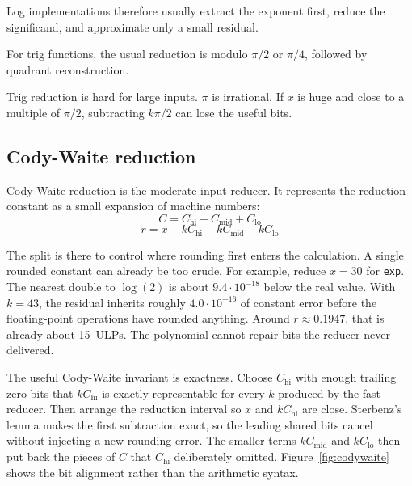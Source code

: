\documentclass[manuscript, nonacm]{acmart}
\begin{document}
  Log implementations therefore usually extract the exponent first, reduce the
  significand, and approximate only a small residual.

  For trig functions, the usual reduction is modulo $\pi/2$ or $\pi/4$,
  followed by quadrant reconstruction.

  Trig reduction is hard for large inputs.  $\pi$ is irrational. If $x$ is
  huge and close to a multiple of $\pi/2$, subtracting $k\pi/2$ can lose the
  useful bits.

  \subsection{Cody-Waite reduction}

  Cody-Waite reduction is the moderate-input reducer. It represents the
  reduction constant as a small expansion of machine numbers:
  \[ C = C_\mathrm{hi} + C_\mathrm{mid} + C_\mathrm{lo} \]
  \[ r = x - kC_\mathrm{hi} - kC_\mathrm{mid} - kC_\mathrm{lo} \]

  The split is there to control where rounding first enters the calculation.
  A single rounded constant can already be too crude. For example, reduce
  $x = 30$ for \texttt{exp}. The nearest double to $\log(2)$ is about
  $9.4 \cdot 10^{-18}$ below the real value. With $k = 43$, the residual
  inherits roughly $4.0 \cdot 10^{-16}$ of constant error before the
  floating-point operations have rounded anything. Around
  $r \approx 0.1947$, that is already about 15~ULPs. The polynomial cannot
  repair bits the reducer never delivered.

  The useful Cody-Waite invariant is exactness. Choose $C_\mathrm{hi}$ with
  enough trailing zero bits that $kC_\mathrm{hi}$ is exactly representable for
  every $k$ produced by the fast reducer. Then arrange the reduction interval
  so $x$ and $kC_\mathrm{hi}$ are close. Sterbenz's lemma makes the first
  subtraction exact, so the leading shared bits cancel without injecting a new
  rounding error. The smaller terms $kC_\mathrm{mid}$ and $kC_\mathrm{lo}$ then
  put back the pieces of $C$ that $C_\mathrm{hi}$ deliberately omitted. Figure~\ref{fig:codywaite}
  shows the bit alignment rather than the arithmetic syntax.
\end{document}
